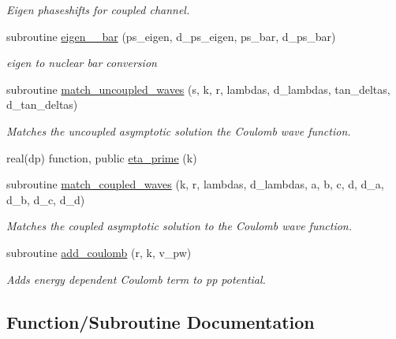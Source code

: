 \begin{DoxyCompactItemize}
\begin{DoxyCompactList}\small\item\em Eigen phaseshifts for coupled channel. \end{DoxyCompactList}\item 
subroutine \hyperlink{namespacenn__phaseshifts_a15db9c0b3bd3b67547327fb5935a8e08}{eigen\+\_\+\_\+bar} (ps\+\_\+eigen, d\+\_\+ps\+\_\+eigen, ps\+\_\+bar, d\+\_\+ps\+\_\+bar)
\begin{DoxyCompactList}\small\item\em eigen to nuclear bar conversion \end{DoxyCompactList}\item 
subroutine \hyperlink{namespacenn__phaseshifts_a1604cc5651f2d6761cb82b494ec40e23}{match\+\_\+uncoupled\+\_\+waves} (s, k, r, lambdas, d\+\_\+lambdas, tan\+\_\+deltas, d\+\_\+tan\+\_\+deltas)
\begin{DoxyCompactList}\small\item\em Matches the uncoupled asymptotic solution the Coulomb wave function. \end{DoxyCompactList}\item 
real(dp) function, public \hyperlink{namespacenn__phaseshifts_af570a5386b15b626b75fe46125ae0abe}{eta\+\_\+prime} (k)
\item 
subroutine \hyperlink{namespacenn__phaseshifts_a06ad5d92bcc80ec0ffd8320854595af6}{match\+\_\+coupled\+\_\+waves} (k, r, lambdas, d\+\_\+lambdas, a, b, c, d, d\+\_\+a, d\+\_\+b, d\+\_\+c, d\+\_\+d)
\begin{DoxyCompactList}\small\item\em Matches the coupled asymptotic solution to the Coulomb wave function. \end{DoxyCompactList}\item 
subroutine \hyperlink{namespacenn__phaseshifts_a4cd6862b1d9183019dfabf2b8a2f1e98}{add\+\_\+coulomb} (r, k, v\+\_\+pw)
\begin{DoxyCompactList}\small\item\em Adds energy dependent Coulomb term to pp potential. \end{DoxyCompactList}\end{DoxyCompactItemize}


\subsection{Function/\+Subroutine Documentation}
\mbox{\label{namespacenn__phaseshifts_a4cd6862b1d9183019dfabf2b8a2f1e98}} 
